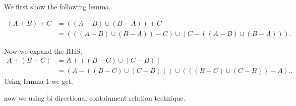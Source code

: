 \begin{solution}
  We first show the following lemma,

  \begin{align*}
    \left(A + B  \right) + C &= \left( \left( A - B \right) \cup \left( B - A \right) \right) + C \\
    &= \left( \left( \left( A - B \right) \cup \left( B - A \right) \right) - C \right) \cup \left( C - \left( \left( A - B  \right) \cup \left( B- A \right) \right) \right)
  .\end{align*}

  Now we expand the RHS,
  \begin{align*}
    A + \left( B + C \right) &= A + \left( \left( B - C \right) \cup  \left( C - B \right) \right) \\
    &= \left( A - \left( \left( B - C \right) \cup  \left( C - B \right) \right) \right) \cup \left( \left( \left( B - C \right) \cup  \left( C - B \right) \right) - A \right).
  .\end{align*}
  Using lemma 1 we get,

  now we using bi directional containment relation technique.

\end{solution}




